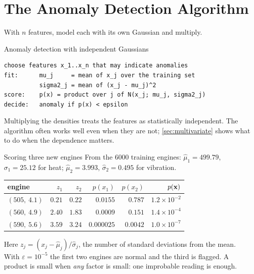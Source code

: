 \section{The Anomaly Detection Algorithm}
\label{sec:ad-alg}

With $n$ features, model each with its own Gaussian and multiply.

\begin{algorithmbox}{Anomaly detection with independent Gaussians}
\begin{lstlisting}[style=pseudocode]
choose features x_1..x_n that may indicate anomalies
fit:      mu_j     = mean of x_j over the training set
          sigma2_j = mean of (x_j - mu_j)^2
score:    p(x) = product over j of N(x_j; mu_j, sigma2_j)
decide:   anomaly if p(x) < epsilon
\end{lstlisting}
Multiplying the densities treats the features as statistically independent.
The algorithm often works well even when they are not; \cref{sec:multivariate}
shows what to do when the dependence matters.
\end{algorithmbox}

\begin{workedexample}{Scoring three new engines}
From the $6000$ training engines: $\hat\mu_1 = 499.79$, $\hat\sigma_1 = 25.12$ for
heat; $\hat\mu_2 = 3.993$, $\hat\sigma_2 = 0.495$ for vibration.

\begin{center}
\small
\renewcommand{\arraystretch}{1.15}
\begin{tabular}{@{}lrrrrr@{}}
\toprule
engine & $z_1$ & $z_2$ & $p(x_1)$ & $p(x_2)$ & $p(\mathbf{x})$\\
\midrule
$(505,\ 4.1)$ & $0.21$ & $0.22$ & $0.0155$ & $0.787$ & $1.2\times10^{-2}$\\
$(560,\ 4.9)$ & $2.40$ & $1.83$ & $0.0009$ & $0.151$ & $1.4\times10^{-4}$\\
$(590,\ 5.6)$ & $3.59$ & $3.24$ & $0.000025$ & $0.0042$ & $1.0\times10^{-7}$\\
\bottomrule
\end{tabular}
\end{center}

Here $z_j = (x_j - \hat\mu_j)/\hat\sigma_j$, the number of standard deviations
from the mean. With $\varepsilon = 10^{-5}$ the first two engines are normal and
the third is flagged. A product is small when \emph{any} factor is small: one
improbable reading is enough.
\end{workedexample}

